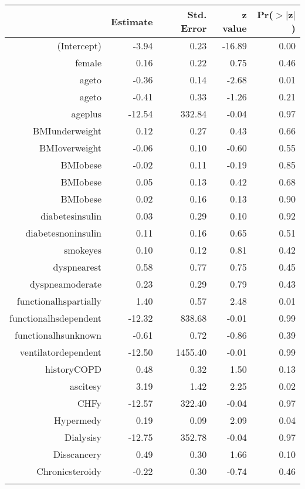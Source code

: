 \bigskip\bigskip
\centering
\begin{tabular}{rrrrr}
  \hline
 & Estimate & Std. Error & z value & Pr($>$$|$z$|$) \\ 
  \hline
(Intercept) & -3.94 & 0.23 & -16.89 & 0.00 \\ 
  female & 0.16 & 0.22 & 0.75 & 0.46 \\ 
  age\-65\-to\-74 & -0.36 & 0.14 & -2.68 & 0.01 \\ 
  age\-75\-to\-84 & -0.41 & 0.33 & -1.26 & 0.21 \\ 
  age\-85\-plus & -12.54 & 332.84 & -0.04 & 0.97 \\ 
  BMI\-underweight & 0.12 & 0.27 & 0.43 & 0.66 \\ 
  BMI\-overweight & -0.06 & 0.10 & -0.60 & 0.55 \\ 
  BMI\-obese\-1 & -0.02 & 0.11 & -0.19 & 0.85 \\ 
  BMI\-obese\-2 & 0.05 & 0.13 & 0.42 & 0.68 \\ 
  BMI\-obese\-3 & 0.02 & 0.16 & 0.13 & 0.90 \\ 
  diabetes\-insulin & 0.03 & 0.29 & 0.10 & 0.92 \\ 
  diabetes\-noninsulin & 0.11 & 0.16 & 0.65 & 0.51 \\ 
  smoke\-yes & 0.10 & 0.12 & 0.81 & 0.42 \\ 
  dyspnea\-rest & 0.58 & 0.77 & 0.75 & 0.45 \\ 
  dyspnea\-moderate & 0.23 & 0.29 & 0.79 & 0.43 \\ 
  functional\-hs\-partially & 1.40 & 0.57 & 2.48 & 0.01 \\ 
  functional\-hs\-dependent & -12.32 & 838.68 & -0.01 & 0.99 \\ 
  functional\-hs\-unknown & -0.61 & 0.72 & -0.86 & 0.39 \\ 
  ventilator\-dependent & -12.50 & 1455.40 & -0.01 & 0.99 \\ 
  history\-COPD & 0.48 & 0.32 & 1.50 & 0.13 \\ 
  ascites\-y & 3.19 & 1.42 & 2.25 & 0.02 \\ 
  CHF\-y & -12.57 & 322.40 & -0.04 & 0.97 \\ 
  Hyper\-med\-y & 0.19 & 0.09 & 2.09 & 0.04 \\ 
  Dialysis\-y & -12.75 & 352.78 & -0.04 & 0.97 \\ 
  Diss\-cancer\-y & 0.49 & 0.30 & 1.66 & 0.10 \\ 
  Chronic\-steroid\-y & -0.22 & 0.30 & -0.74 & 0.46 \\ 
$$
\end{tabular}
